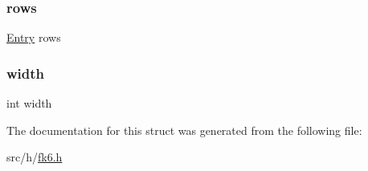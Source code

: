 \mbox{\label{structfk6__catalog_a43460f7d2ae6b7f4e1577fba8b51894e}} 
\subsubsection{\texorpdfstring{rows}{rows}}
{\footnotesize\ttfamily \mbox{\hyperlink{struct_entry}{Entry}} rows}

\mbox{\label{structfk6__catalog_a2474a5474cbff19523a51eb1de01cda4}} 
\subsubsection{\texorpdfstring{width}{width}}
{\footnotesize\ttfamily int width}



The documentation for this struct was generated from the following file\+:\begin{DoxyCompactItemize}
\item 
src/h/\mbox{\hyperlink{fk6_8h}{fk6.\+h}}\end{DoxyCompactItemize}
